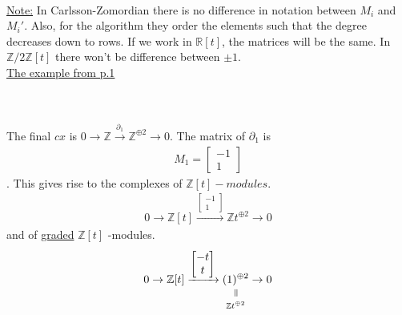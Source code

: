 \documentclass[11pt,a4paper]{report}
\newcommand{\verteq}{\rotatebox{90}{$\,=$}}
\newcommand{\equalto}[2]{\underset{\scriptstyle\overset{\mkern4mu\verteq}{#2}}{#1}}
\begin{document}
              \\
              \underline{Note:} In Carlsson-Zomordian there is no difference in notation between $M_i$ and $M_i'$. Also, for the algorithm they order the elements such that the degree decreases down to rows. If we work in $\mathbb{R}[t]$, the matrices will be the same. In $\mathbb{Z}/2\mathbb{Z}[t]$ there won't be difference between $\pm 1$.\\
              \underline{The example from p.1}\\
              \\
              \\
              The final $cx$ is $0 \rightarrow \mathbb{Z} \xrightarrow{\partial_1} \mathbb{Z}^{\oplus2} \rightarrow 0$. The matrix of $\partial_1$ is \begin{align*}M_1 = \begin{bmatrix}-1\\1\end{bmatrix}\end{align*}. This gives rise to the complexes of $\mathbb{Z}[t] - modules$.\\
              \begin{align*}
                0 \rightarrow \mathbb{Z}[t] \xrightarrow{\begin{bmatrix}-1\\1\end{bmatrix}} \mathbb{Z}t^{\oplus2} \rightarrow 0
              \end{align*}
              and of \underline{graded} $\mathbb{Z}[t]$ -modules.
              \begin{align*}
                0 \rightarrow \mathbb{Z}[t] \xrightarrow{\begin{bmatrix}-t\\t\end{bmatrix}} \equalto{(1)^{\oplus2}}{\mathbb{Z}t^{\oplus2}} \rightarrow 0
              \end{align*}
\end{document}
